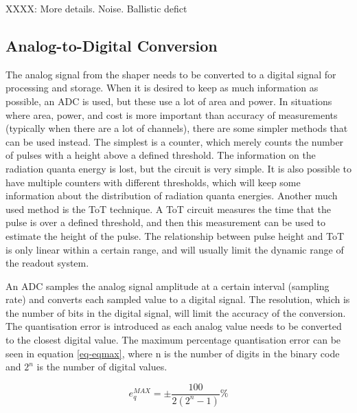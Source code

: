 \documentclass[../main/thesis.tex]{subfiles}
\begin{document}
XXXX: More details. Noise. Ballistic defict

\subsection{Analog-to-Digital Conversion}
\label{t-adc}
The analog signal from the shaper needs to be converted to a digital signal for processing and storage. When it is desired to keep as much information as possible, an \gls{ADC} is used, but these use a lot of area and power. In situations where area, power, and cost is more important than accuracy of measurements (typically when there are a lot of channels), there are some simpler methods that can be used instead. The simplest is a counter, which merely counts the number of pulses with a height above a defined threshold. The information on the radiation quanta energy is lost, but the circuit is very simple. It is also possible to have multiple counters with different thresholds, which will keep some information about the distribution of radiation quanta energies. Another much used method is the \gls{ToT} technique. A \gls{ToT} circuit measures the time that the pulse is over a defined threshold, and then this measurement can be used to estimate the height of the pulse. The relationship between pulse height and \gls{ToT} is only linear within a certain range, and will usually limit the dynamic range of the readout system. \citep[chap. 6]{ToT}


An \gls{ADC} samples the analog signal amplitude at a certain interval (sampling rate) and converts each sampled value to a digital signal. The resolution, which is the number of bits in the digital signal, will limit the accuracy of the conversion. The quantisation error is introduced as each analog value needs to be converted to the closest digital value. The maximum percentage quantisation error can be seen in equation \ref{eq-eqmax}, where n is the number of digits in the binary code and $2^n$ is the number of digital values. \citep[chap. 10]{Bentley}

\begin{equation}%
e_q^{MAX} = \pm \frac{100}{2(2^n - 1)}\%
\label{eq-eqmax}
\end{equation}
\end{document}
